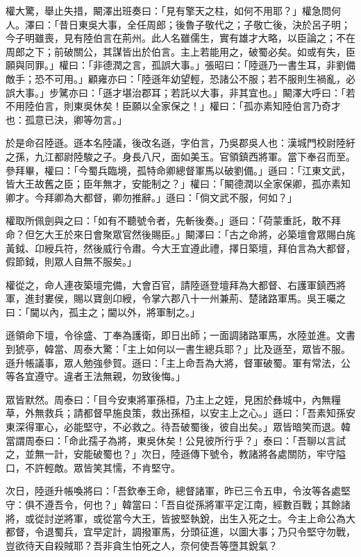 權大驚，舉止失措，闞澤出班奏曰：「見有擎天之柱，如何不用耶？」權急問何人。澤曰：「昔日東吳大事，全任周郎；後魯子敬代之；子敬亡後，決於呂子明；今子明雖喪，見有陸伯言在荊州。此人名雖儒生，實有雄才大略，以臣論之；不在周郎之下；前破關公，其謀皆出於伯言。主上若能用之，破蜀必矣。如或有失，臣願與同罪。」權曰：「非德潤之言，孤誤大事。」張昭曰：「陸遜乃一書生耳，非劉備敵手；恐不可用。」顧雍亦曰：「陸遜年幼望輕，恐諸公不服；若不服則生禍亂，必誤大事。」步騭亦曰：「遜才堪治郡耳；若託以大事，非其宜也。」闞澤大呼曰：「若不用陸伯言，則東吳休矣！臣願以全家保之！」權曰：「孤亦素知陸伯言乃奇才也：孤意已決，卿等勿言。」

於是命召陸遜。遜本名陸議，後改名遜，字伯言，乃吳郡吳人也：漢城門校尉陸紆之孫，九江都尉陸駿之子。身長八尺，面如美玉。官領鎮西將軍。當下奉召而至。參拜畢，權曰：「今蜀兵臨境，孤特命卿總督軍馬以破劉備。」遜曰：「江東文武，皆大王故舊之臣；臣年無才，安能制之？」權曰：「闞德潤以全家保卿，孤亦素知卿才。今拜卿為大都督，卿勿推辭。」遜曰：「倘文武不服，何如？」

權取所佩劍與之曰：「如有不聽號令者，先斬後奏。」遜曰：「荷蒙重託，敢不拜命？但乞大王於來日會聚眾官然後賜臣。」闞澤曰：「古之命將，必築壇會眾賜白旄黃鉞、卬綬兵符，然後威行令肅。今大王宜遵此禮，擇日築壇，拜伯言為大都督，假節鉞，則眾人自無不服矣。」

權從之，命人連夜築壇完備，大會百官，請陸遜登壇拜為大都督、右護軍鎮西將軍，進封婁侯，賜以寶劍卬綬，令掌六郡八十一州兼荊、楚諸路軍馬。吳王囑之曰：「閫以內，孤主之；閫以外，將軍制之。」

遜領命下壇，令徐盛、丁奉為護衛，即日出師；一面調諸路軍馬，水陸並進。文書到猇亭，韓當、周泰大驚：「主上如何以一書生總兵耶？」比及遜至，眾皆不服。遜升帳議事，眾人勉強參賀。遜曰：「主上命吾為大將，督軍破蜀。軍有常法，公等各宜遵守。違者王法無親，勿致後悔。」

眾皆默然。周泰曰：「目今安東將軍孫桓，乃主上之姪，見困於彝城中，內無糧草，外無救兵；請都督早施良策，救出孫桓，以安主上之心。」遜曰：「吾素知孫安東深得軍心，必能堅守，不必救之。待吾破蜀後，彼自出矣。」眾皆暗笑而退。韓當謂周泰曰：「命此孺子為將，東吳休矣！公見彼所行乎？」泰曰：「吾聊以言試之，並無一計，安能破蜀也？」次日，陸遜傳下號令，教諸將各處關防，牢守隘口，不許輕敵。眾皆笑其懦，不肯堅守。

次日，陸遜升帳喚將曰：「吾欽奉王命，總督諸軍，昨已三令五申，令汝等各處堅守：俱不遵吾令，何也？」韓當曰：「吾自從孫將軍平定江南，經數百戰；其餘諸將，或從討逆將軍，或從當今大王，皆披堅執銳，出生入死之士。今主上命公為大都督，令退蜀兵，宜早定計，調撥軍馬，分頭征進，以圖大事；乃只令堅守勿戰，豈欲待天自殺賊耶？吾非貪生怕死之人，奈何使吾等墮其銳氣？

